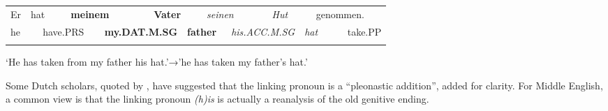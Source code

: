 \begin{tabular}{llllllllllllll}
\lsptoprule
Er & \multicolumn{2}{l}{hat

} & \multicolumn{2}{l}{{\bfseries meinem}

} & \multicolumn{2}{l}{{\bfseries Vater}

} & \multicolumn{2}{l}{{\itshape seinen}

} & \multicolumn{2}{l}{{\itshape Hut}

} & \multicolumn{2}{l}{genommen.

} & \\
\multicolumn{2}{l}{he

} & \multicolumn{2}{l}{have.PRS

} & \multicolumn{2}{l}{{\bfseries my.DAT.M.SG}

} & \multicolumn{2}{l}{{\bfseries father}

} & \multicolumn{2}{l}{{\itshape his.ACC.M.SG}

} & \multicolumn{2}{l}{{\itshape hat}

} & \multicolumn{2}{l}{take.PP

}\\
\lspbottomrule
\end{tabular}

\begin{styleTranslation}
‘He has taken from my father his hat.’→’he has taken my father’s hat.’

\end{styleTranslation}

\begin{styleBodyTextFirst}
Some Dutch scholars, quoted by \citet[58]{Norde1997}, have suggested that the linking pronoun is a “pleonastic addition”, added for clarity. For Middle English, a common view is that the linking pronoun \textit{(h)is} is actually a reanalysis of the old genitive ending.

\end{styleBodyTextFirst}

